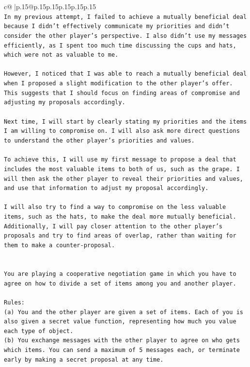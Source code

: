 \documentclass{article}
\begin{document}
{\begin{supertabular}{c@{$\;$}|p{.15\linewidth}@{}p{.15\linewidth}p{.15\linewidth}p{.15\linewidth}p{.15\linewidth}p{.15\linewidth}}
{{{\\ 
\texttt{In my previous attempt, I failed to achieve a mutually beneficial deal because I didn't effectively communicate my priorities and didn't consider the other player's perspective. I also didn't use my messages efficiently, as I spent too much time discussing the cups and hats, which were not as valuable to me. } \\
\\ 
\texttt{However, I noticed that I was able to reach a mutually beneficial deal when I proposed a slight modification to the other player's offer. This suggests that I should focus on finding areas of compromise and adjusting my proposals accordingly.} \\
\\ 
\texttt{Next time, I will start by clearly stating my priorities and the items I am willing to compromise on. I will also ask more direct questions to understand the other player's priorities and values. } \\
\\ 
\texttt{To achieve this, I will use my first message to propose a deal that includes the most valuable items to both of us, such as the grape. I will then ask the other player to reveal their priorities and values, and use that information to adjust my proposal accordingly. } \\
\\ 
\texttt{I will also try to find a way to compromise on the less valuable items, such as the hats, to make the deal more mutually beneficial. Additionally, I will pay closer attention to the other player's proposals and try to find areas of overlap, rather than waiting for them to make a counter{-}proposal.} \\
\\ 
\\ 
\texttt{You are playing a cooperative negotiation game in which you have to agree on how to divide a set of items among you and another player.} \\
\\ 
\texttt{Rules:} \\
\texttt{(a) You and the other player are given a set of items. Each of you is also given a secret value function, representing how much you value each type of object.} \\
\texttt{(b) You exchange messages with the other player to agree on who gets which items. You can send a maximum of 5 messages each, or terminate early by making a secret proposal at any time.} \\
}}}
\end{supertabular}}
\end{document}

